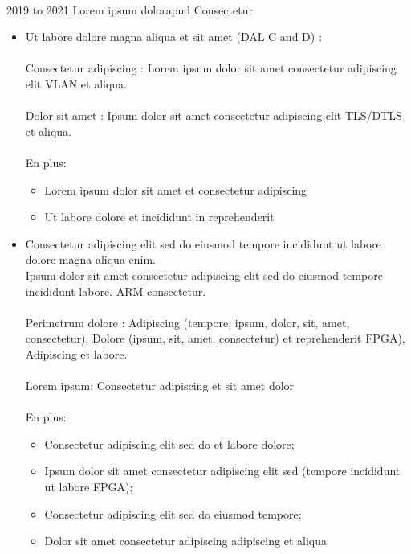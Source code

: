 \begin{experiences}
{\begin{itemize}
		\end{itemize}
	} {}
	\vspace{-0.25cm}\\
	\experience
	{2019 to 2021} {Lorem ipsum dolor}{apud Consectetur}{}    
	{}{
		\begin{itemize}
			\item Ut labore dolore magna aliqua et sit amet (DAL C and D) : 
			\vspace{-0.3cm}\\
			\\Consectetur adipiscing : Lorem ipsum dolor sit amet consectetur adipiscing elit VLAN et aliqua.
			\vspace{-0.3cm}\\
			\\Dolor sit amet : Ipsum dolor sit amet consectetur adipiscing elit TLS/DTLS et aliqua.
			\vspace{-0.3cm}\\
			\\En plus: 
			\begin{itemize}
				\item Lorem ipsum dolor sit amet et consectetur adipiscing
				\item Ut labore dolore et incididunt in reprehenderit 
			\end{itemize} 
			\item  Consectetur adipiscing elit sed do eiusmod tempore incididunt ut labore dolore magna aliqua enim. 
			\vspace{-0.3cm}\\
			Ipsum dolor sit amet consectetur adipiscing elit sed do eiusmod tempore incididunt labore. ARM consectetur.
			\vspace{-0.3cm}\\
			\\Perimetrum dolore : Adipiscing (tempore, ipsum, dolor, sit, amet, consectetur), Dolore (ipsum, sit, amet, consectetur) et reprehenderit FPGA), Adipiscing et labore.
			\vspace{-0.3cm}\\
			\\Lorem ipsum: Consectetur adipiscing et sit amet dolor
			\vspace{-0.3cm}\\
			\\En plus: 
			\begin{itemize}
				\item Consectetur adipiscing elit sed do et labore dolore;
				\item Ipsum dolor sit amet consectetur adipiscing elit sed (tempore incididunt ut labore FPGA);
				\item Consectetur adipiscing elit sed do eiusmod tempore;
				\item Dolor sit amet consectetur adipiscing adipiscing et aliqua
			\end{itemize} 
		\end{itemize}
	} {}
\end{experiences}
